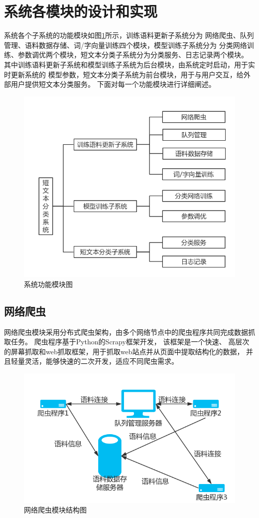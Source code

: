 \documentclass{standalone}
\begin{document}
\section{系统各模块的设计和实现}
系统各个子系统的功能模块如图\ref{system_module}所示，训练语料更新子系统分为
网络爬虫、队列管理、语料数据存储、词/字向量训练四个模块，模型训练子系统分为
分类网络训练、参数调优两个模块，短文本分类子系统分为分类服务、日志记录两个模块。
其中训练语料更新子系统和模型训练子系统为后台模块，由系统定时启动，用于实时更新系统的
模型参数，短文本分类子系统为前台模块，用于与用户交互，给外部用户提供短文本分类服务。
下面对每一个功能模块进行详细阐述。
\begin{figure}[h]
    \includegraphics[scale=0.45]{picture/system_module.png}
    \caption{系统功能模块图}
    \label{system_module}
\end{figure}
\subsection{网络爬虫}
网络爬虫模块采用分布式爬虫架构，由多个网络节点中的爬虫程序共同完成数据抓取任务。
爬虫程序基于Python的Scrapy框架开发，
该框架是一个快速、
高层次的屏幕抓取和web抓取框架，用于抓取web站点并从页面中提取结构化的数据，
并且轻量灵活，能够快速的二次开发，适应不同爬虫需求。
\begin{figure}[h]
    \includegraphics[scale=0.5]{picture/spider.png}
    \caption{网络爬虫模块结构图}
    \label{spider}
\end{figure}
\end{document}
